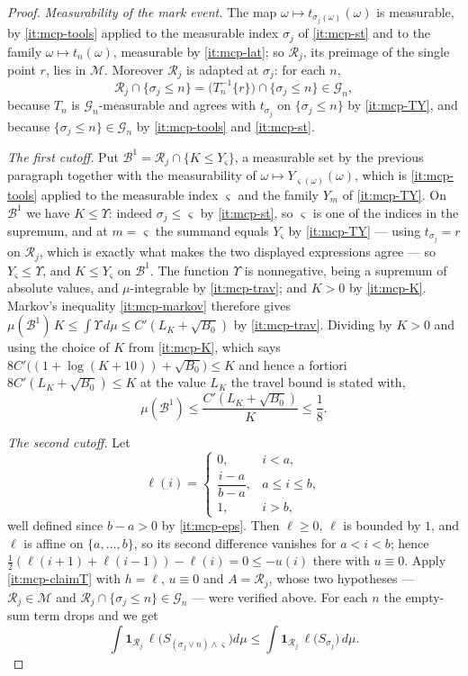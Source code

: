 \begin{proof}
\emph{Measurability of the mark event.} The map
$\omega\mapsto t_{\sigma_j(\omega)}(\omega)$ is measurable, by
\ref{it:mcp-tools} applied to the measurable index $\sigma_j$ of
\ref{it:mcp-st} and to the family $\omega\mapsto t_n(\omega)$, measurable by
\ref{it:mcp-lat}; so $\mathcal R_j$, its preimage of the single point $r$, lies
in $\mathcal M$. Moreover $\mathcal R_j$ is adapted at $\sigma_j$: for each $n$,
\[
  \mathcal R_j\cap\{\sigma_j\le n\}
   =\bigl(T_n^{-1}\{r\}\bigr)\cap\{\sigma_j\le n\}\in\mathcal G_n ,
\]
because $T_n$ is $\mathcal G_n$-measurable and agrees with $t_{\sigma_j}$ on
$\{\sigma_j\le n\}$ by \ref{it:mcp-TY}, and because
$\{\sigma_j\le n\}\in\mathcal G_n$ by \ref{it:mcp-tools} and
\ref{it:mcp-st}.

\emph{The first cutoff.} Put
$\mathcal B^1=\mathcal R_j\cap\{K\le Y_{\varsigma}\}$, a measurable set by the
previous paragraph together with the measurability of
$\omega\mapsto Y_{\varsigma(\omega)}(\omega)$, which is \ref{it:mcp-tools}
applied to the measurable index $\varsigma$ and the family $Y_m$ of
\ref{it:mcp-TY}. On $\mathcal B^1$ we have $K\le\Upsilon$: indeed
$\sigma_j\le\varsigma$ by \ref{it:mcp-st}, so $\varsigma$ is one of the indices
in the supremum, and at $m=\varsigma$ the summand equals $Y_\varsigma$ by
\ref{it:mcp-TY} --- using $t_{\sigma_j}=r$ on $\mathcal R_j$, which is exactly
what makes the two displayed expressions agree --- so
$Y_\varsigma\le\Upsilon$, and $K\le Y_\varsigma$ on $\mathcal B^1$. The
function $\Upsilon$ is nonnegative, being a supremum of absolute values, and
$\mu$-integrable by \ref{it:mcp-trav}; and $K>0$ by \ref{it:mcp-K}. Markov's
inequality \ref{it:mcp-markov} therefore gives
$\mu(\mathcal B^1)\,K\le\int\Upsilon\,d\mu\le C'(L_K+\sqrt{B_0})$ by
\ref{it:mcp-trav}. Dividing by $K>0$ and using the choice of $K$ from
\ref{it:mcp-K}, which says $8C'\bigl((1+\log(K+10))+\sqrt{B_0}\bigr)\le K$ and
hence a fortiori $8C'(L_K+\sqrt{B_0})\le K$ at the value $L_K$ the travel bound
is stated with,
\[
  \mu(\mathcal B^1)\le\frac{C'(L_K+\sqrt{B_0})}{K}\le\frac18 .
\]

\emph{The second cutoff.} Let
\[
  \ell(i)=\begin{cases}0,&i<a,\\ \dfrac{i-a}{b-a},&a\le i\le b,\\ 1,&i>b,\end{cases}
\]
well defined since $b-a>0$ by \ref{it:mcp-eps}. Then $\ell\ge0$, $\ell$ is
bounded by $1$, and $\ell$ is affine on $\{a,\dots,b\}$, so its second
difference vanishes for $a<i<b$; hence
$\tfrac12(\ell(i+1)+\ell(i-1))-\ell(i)=0\le-u(i)$ there with $u\equiv0$. Apply
\ref{it:mcp-claimT} with $h=\ell$, $u\equiv0$ and $A=\mathcal R_j$, whose two
hypotheses --- $\mathcal R_j\in\mathcal M$ and
$\mathcal R_j\cap\{\sigma_j\le n\}\in\mathcal G_n$ --- were verified above. For
each $n$ the empty-sum term drops and we get
\begin{equation}\label{eq:mcp-claim}
  \int\mathbf1_{\mathcal R_j}\,
    \ell\bigl(S_{(\sigma_j\vee n)\wedge\varsigma}\bigr)d\mu
  \le\int\mathbf1_{\mathcal R_j}\,\ell\bigl(S_{\sigma_j}\bigr)\,d\mu .
\end{equation}


\end{proof}
